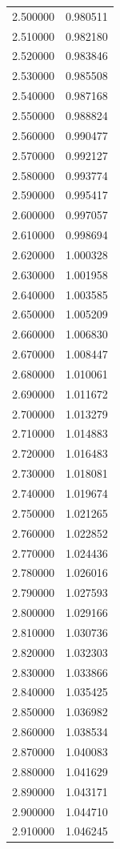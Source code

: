 \begin{tabular}{rr}
2.500000 & 0.980511 \\
2.510000 & 0.982180 \\
2.520000 & 0.983846 \\
2.530000 & 0.985508 \\
2.540000 & 0.987168 \\
2.550000 & 0.988824 \\
2.560000 & 0.990477 \\
2.570000 & 0.992127 \\
2.580000 & 0.993774 \\
2.590000 & 0.995417 \\
2.600000 & 0.997057 \\
2.610000 & 0.998694 \\
2.620000 & 1.000328 \\
2.630000 & 1.001958 \\
2.640000 & 1.003585 \\
2.650000 & 1.005209 \\
2.660000 & 1.006830 \\
2.670000 & 1.008447 \\
2.680000 & 1.010061 \\
2.690000 & 1.011672 \\
2.700000 & 1.013279 \\
2.710000 & 1.014883 \\
2.720000 & 1.016483 \\
2.730000 & 1.018081 \\
2.740000 & 1.019674 \\
2.750000 & 1.021265 \\
2.760000 & 1.022852 \\
2.770000 & 1.024436 \\
2.780000 & 1.026016 \\
2.790000 & 1.027593 \\
2.800000 & 1.029166 \\
2.810000 & 1.030736 \\
2.820000 & 1.032303 \\
2.830000 & 1.033866 \\
2.840000 & 1.035425 \\
2.850000 & 1.036982 \\
2.860000 & 1.038534 \\
2.870000 & 1.040083 \\
2.880000 & 1.041629 \\
2.890000 & 1.043171 \\
2.900000 & 1.044710 \\
2.910000 & 1.046245 \\

\end{tabular}
